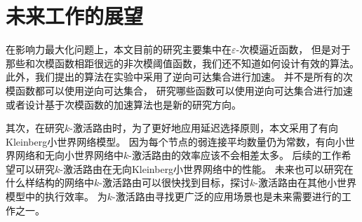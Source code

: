 \section{未来工作的展望}
在影响力最大化问题上，本文目前的研究主要集中在$\varepsilon$-次模逼近函数，
但是对于那些和次模函数相距很远的非次模阈值函数，我们还不知道如何设计有效的算法。
此外，我们提出的算法在实验中采用了逆向可达集合进行加速。
并不是所有的次模函数都可以使用逆向可达集合，
研究哪些函数可以使用逆向可达集合进行加速或者设计基于次模函数的加速算法也是新的研究方向。

其次，在研究$k$-激活路由时，为了更好地应用延迟选择原则，本文采用了有向Kleinberg小世界网络模型。
因为每个节点的弱连接平均数量仍为常数，有向小世界网络和无向小世界网络中$k$-激活路由的效率应该不会相差太多。
后续的工作希望可以研究$k$-激活路由在无向Kleinberg小世界网络中的性能。
未来也可以研究在什么样结构的网络中$k$-激活路由可以很快找到目标，探讨$k$-激活路由在其他小世界模型中的执行效率。
为$k$-激活路由寻找更广泛的应用场景也是未来需要进行的工作之一。


